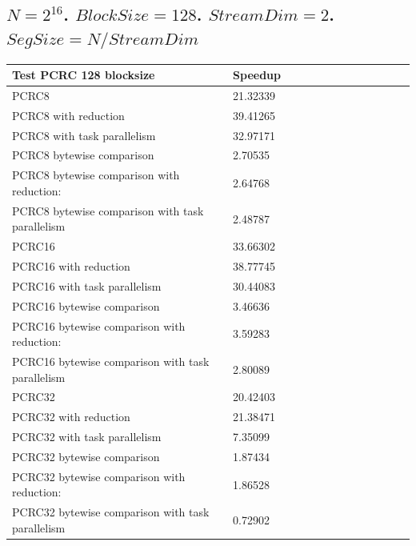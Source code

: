 \documentclass[fleqn]{IEEEtran}
\begin{document}
\subsection{$N=2^{16}$. $BlockSize=128$. $StreamDim=2$. $SegSize=N/StreamDim$}
\begin{footnotesize}
\begin{tabular}{l|l|l|l|l|r|r|r|r|r|r||c|c|}
\toprule
\textbf{Test PCRC 128 blocksize} & \textbf{Speedup} \\
\midrule
PCRC8                                           &	21.32339 \\
PCRC8 with reduction                            &	39.41265 \\
PCRC8 with task parallelism                     &	32.97171 \\
PCRC8 bytewise comparison                       &	2.70535  \\
PCRC8 bytewise comparison with reduction:       &	2.64768  \\
PCRC8 bytewise comparison with task parallelism &	2.48787  \\
PCRC16                                           &	33.66302 \\
PCRC16 with reduction                            &	38.77745 \\
PCRC16 with task parallelism                     &	30.44083 \\
PCRC16 bytewise comparison                       &	3.46636  \\
PCRC16 bytewise comparison with reduction:       &	3.59283  \\
PCRC16 bytewise comparison with task parallelism &	2.80089  \\
PCRC32                                           &	20.42403 \\
PCRC32 with reduction                            &	21.38471 \\
PCRC32 with task parallelism                     &	7.35099  \\
PCRC32 bytewise comparison                       &	1.87434  \\
PCRC32 bytewise comparison with reduction:       &	1.86528  \\
PCRC32 bytewise comparison with task parallelism &	0.72902  \\
\bottomrule
\end{tabular}
\end{footnotesize}
\end{document}
